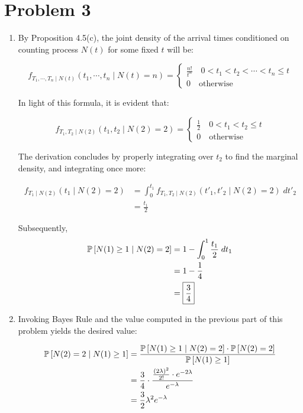 \documentclass[12pt]{article}%
\begin{document}
\section{Problem 3}
\begin{enumerate}
  \item By Proposition 4.5(c), the joint density of the arrival times conditioned on counting process $N(t)$ for some fixed $t$ will be:

\[ f_{T_1,\cdots,T_n\mid N(t)}(t_1,\cdots,t_n\mid N(t) = n) = \begin{cases}
    \frac{n!}{t^{n}} \quad 0 < t_1 < t_2 < \cdots < t_n \leq t \\
    0 \quad \text{otherwise}
\end{cases} \]

  In light of this formula, it is evident that:

  \[ f_{T_1,T_2\mid N(2)}(t_1,t_2 \mid N(2) = 2) = \begin{cases}
      \frac{1}{2} \quad 0 < t_1 < t_2  \leq t \\
      0 \quad \text{otherwise}
  \end{cases} \]

  The derivation concludes by properly integrating over $t_2$ to find the marginal density, and integrating once more:

  \begin{align*}
     f_{T_1\mid N(2)}(t_1\mid N(2)=2) & = \int_0^{t_1} f_{T_1,T_2\mid N(2)}(t'_1,t'_2 \mid N(2) = 2) \; dt'_2 \\
    & = \frac{t_1}{2}
    \end{align*}

  Subsequently,
  \begin{align*}
    \mathbb{P}\left[N(1) \geq 1 \mid N(2) = 2\right] &  = 1 - \int_{0}^1 \frac{t_1}{2}\; dt_1 \\
    & = 1 - \frac{1}{4} \\
    & = \boxed{\frac{3}{4}}
  \end{align*}

  \item
  Invoking Bayes Rule and the value computed in the previous part of this problem yields the desired value:

  \begin{align}
    \mathbb{P}\left[N(2) = 2  \mid N(1) \geq 1\right] & = \frac{\mathbb{P}\left[N(1) \geq 1 \mid N(2) = 2\right]\cdot\mathbb{P}\left[N(2)=2\right]}{\mathbb{P}\left[N(1) \geq 1\right]} \\
    & = \frac{3}{4}\cdot \frac{\frac{(2\lambda)^2}{2!}\cdot e^{-2\lambda}}{e^{-\lambda}} \\
    & = \frac{3}{2}\lambda^2e^{-\lambda}
  \end{align}

\end{enumerate}
\end{document}
